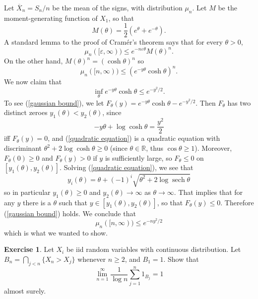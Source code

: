 \documentclass[10pt]{article}
\newcommand{\RR}{\mathbb{R}}
\DeclareMathOperator{\sech}{sech}
\theoremstyle{definition}
\newtheorem{exer}{Exercise}
\begin{document}
Let $\overline X_n = S_n/n$ be the mean of the signs, with distribution $\mu_n$.
Let $M$ be the moment-generating function of $X_1$, so that
$$M(\theta) = \frac{1}{2}(e^\theta + e^{-\theta}).$$
A standard lemma to the proof of Cram\'er's theorem says that for every $\theta > 0$,
$$\mu_n([\varepsilon, \infty)) \leq e^{-n\varepsilon\theta} M(\theta)^n.$$
On the other hand, $M(\theta)^n = (\cosh \theta)^n$ so
$$\mu_n([n, \infty)) \leq (e^{-y\theta} \cosh \theta)^n.$$
We now claim that
\begin{equation}
\label{gaussian bound}
\inf_\theta e^{-y\theta} \cosh \theta \leq e^{-y^2/2}.
\end{equation}
To see (\ref{gaussian bound}), we let $F_\theta(y) = e^{-y\theta} \cosh \theta - e^{-y^2/2}$. Then $F_\theta$ has two distinct zeroes $y_1(\theta) < y_2(\theta)$, since
\begin{equation}
\label{quadratic equation}
-y\theta + \log \cosh \theta = \frac{y^2}{2}
\end{equation}
iff $F_\theta(y) = 0$, and (\ref{quadratic equation}) is a quadratic equation with discriminant $\theta^2 + 2\log \cosh \theta \geq 0$ (since $\theta \in \RR$, thus $\cos \theta \geq 1$).
Moreover, $F_\theta(0) \geq 0$ and $F_\theta(y) > 0$ if $y$ is sufficiently large, so $F_\theta \leq 0$ on $[y_1(\theta), y_2(\theta)]$.
Solving (\ref{quadratic equation}), we see that
$$y_i(\theta) = \theta + (-1)^{i}\sqrt{\theta^2 + 2 \log \sech \theta}$$
so in particular $y_1(\theta) \geq 0$ and $y_2(\theta) \to \infty$ as $\theta \to \infty$.
That implies that for any $y$ there is a $\theta$ such that $y \in [y_1(\theta), y_2(\theta)]$, so that $F_\theta(y) \leq 0$.
Therefore (\ref{gaussian bound}) holds.
We conclude that
$$\mu_n([n, \infty)) \leq e^{-ny^2/2}$$
which is what we wanted to show.




\begin{exer}
Let $X_i$ be iid random variables with continuous distribution. Let $B_n = \bigcap_{j < n} \{X_n > X_j\}$ whenever $n \geq 2$, and $B_1 = 1$. Show that
$$\lim_{n = 1}^\infty \frac{1}{\log n} \sum_{j=1}^n 1_{B_j} = 1$$
almost surely.
\end{exer}
\end{document}
